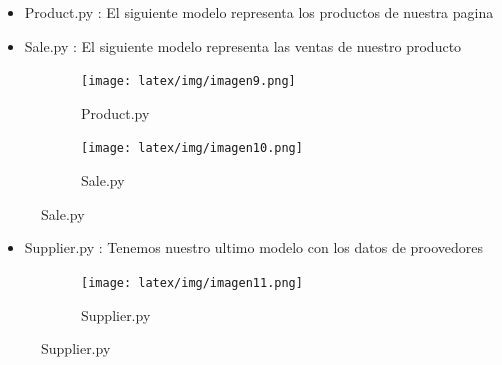 \documentclass{article}
\begin{document}
    \begin{itemize}		
		\item Product.py : El siguiente modelo representa los productos de nuestra pagina
            \item Sale.py : El siguiente modelo representa las ventas de nuestro producto
	\end{itemize}
         \begin{figure}[h]
        \begin{subfigure}{0.5\textwidth}
            \centering
            \texttt{[image: latex/img/imagen9.png]}
            \caption{Product.py}
            \label{fig:primer}
        \end{subfigure}
        \begin{subfigure}{0.5\textwidth}
            \centering
            \texttt{[image: latex/img/imagen10.png]}
            \caption{Sale.py}
            \label{fig:primer}
        \end{subfigure}
    \end{figure}
    \newpage
    \begin{itemize}		
		\item Supplier.py : Tenemos nuestro ultimo modelo con los datos de proovedores
	\end{itemize}
         \begin{figure}[h]
        \begin{subfigure}{0.5\textwidth}
            \centering
            \texttt{[image: latex/img/imagen11.png]}
            \caption{Supplier.py}
            \label{fig:primer}
        \end{subfigure}
    \end{figure}
    
		
\end{document}

